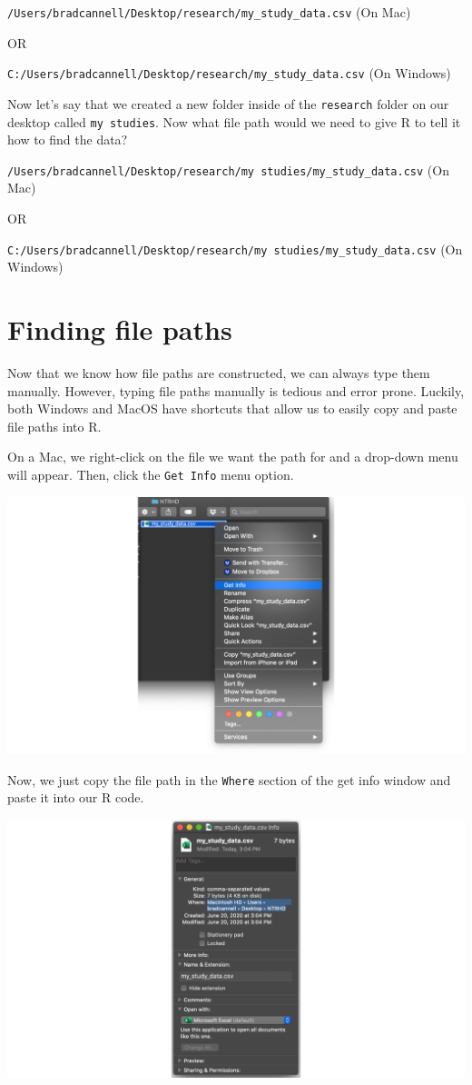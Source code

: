\documentclass[
  letterpaper,
  DIV=11,
  numbers=noendperiod]{scrreprt}
\begin{document}
\texttt{/Users/bradcannell/Desktop/research/my\_study\_data.csv} (On
Mac)

OR

\texttt{C:/Users/bradcannell/Desktop/research/my\_study\_data.csv} (On
Windows)

Now let's say that we created a new folder inside of the
\texttt{research} folder on our desktop called \texttt{my\ studies}. Now
what file path would we need to give R to tell it how to find the data?

\texttt{/Users/bradcannell/Desktop/research/my\ studies/my\_study\_data.csv}
(On Mac)

OR

\texttt{C:/Users/bradcannell/Desktop/research/my\ studies/my\_study\_data.csv}
(On Windows)

\section{Finding file paths}\label{finding-file-paths}

Now that we know how file paths are constructed, we can always type them
manually. However, typing file paths manually is tedious and error
prone. Luckily, both Windows and MacOS have shortcuts that allow us to
easily copy and paste file paths into R.

On a Mac, we right-click on the file we want the path for and a
drop-down menu will appear. Then, click the \texttt{Get\ Info} menu
option.

\includegraphics{chapters/file_paths/get_info.png}

Now, we just copy the file path in the \texttt{Where} section of the get
info window and paste it into our R code.

\includegraphics{chapters/file_paths/where.png}
\end{document}
